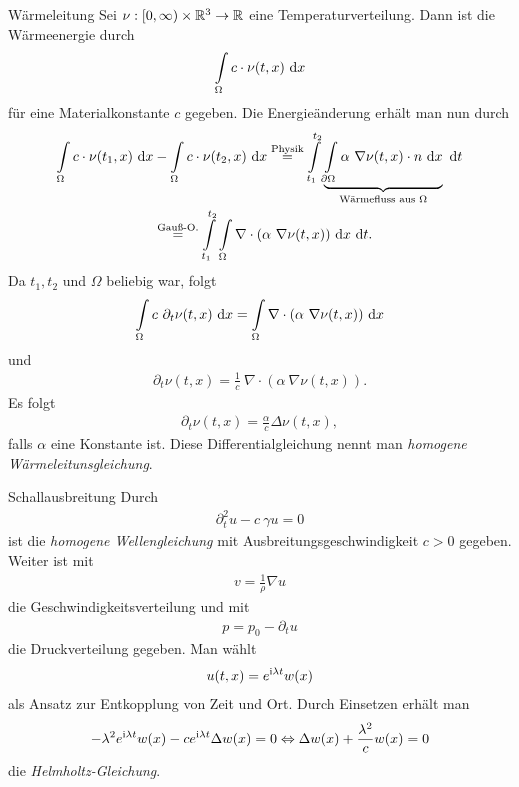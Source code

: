\begin{genericdf}{Wärmeleitung}
Sei $\nu:[0, \infty) \times \mathbb{R}^3 \to \mathbb{R}$ eine Temperaturverteilung.
Dann ist die Wärmeenergie durch
\begin{align*}
\int \limits_\Omega c \cdot \nu(t,x) \ \text{\rmfamily d} x
\end{align*}
für eine Materialkonstante $c$ gegeben.
Die Energieänderung erhält man nun durch
\begin{align*}
\int \limits_\Omega c \cdot \nu(t_1,x) \ \text{\rmfamily d} x
&-
\int \limits_\Omega c \cdot \nu(t_2,x) \ \text{\rmfamily d} x
\stackrel{\text{Physik}}{=}
\int \limits_{t_1}^{t_2} 
\underbrace{\int \limits _{\partial \Omega} 
\alpha \ \nabla \nu(t,x) \cdot n \ \text{\rmfamily d} x}_{\text{Wärmefluss aus $\Omega$}} \ \text{\rmfamily d} t\\
&\stackrel{\text{Gauß-O.}}{=}
\int \limits_{t_1}^{t_2}
\int \limits_\Omega 
\nabla \cdot ( \alpha \ \nabla \nu(t,x)) \ \text{\rmfamily d} x \ \text{\rmfamily d} t.
\end{align*}
Da $t_1,t_2 $ und $\Omega$ beliebig war, folgt
\begin{align*}
\int \limits_{\Omega}
c \ \partial_t \nu(t,x)  \ \text{\rmfamily d} x
= 
\int \limits_{\Omega}
\nabla \cdot ( \alpha \ \nabla \nu(t,x)) \ \text{\rmfamily d} x
\end{align*}
und
\begin{align*}
\partial_t \nu(t,x) = \frac{1}{c} \ \nabla \cdot ( \alpha \ \nabla \nu(t,x)).
\end{align*}
Es folgt
\begin{align*}
\partial_t \nu(t,x) = \frac{\alpha}{c} \Delta\nu(t,x),
\end{align*}
falls $\alpha$ eine Konstante ist.
Diese Differentialgleichung nennt man \textit{homogene Wärmeleitunsgleichung}.	
\end{genericdf}

\begin{genericdf}{Schallausbreitung}
Durch
\begin{align*}
\partial^2_t u- c \ \gamma u = 0
\end{align*}
ist die \textit{homogene Wellengleichung} mit Ausbreitungsgeschwindigkeit $c > 0$ gegeben.
Weiter ist mit
\begin{align*}
v = \frac{1}{\rho} \nabla u
\end{align*}
die Geschwindigkeitsverteilung und mit
\begin{align*}
p = p_0 - \partial_t u
\end{align*}
die Druckverteilung gegeben.
Man wählt 
\begin{align*}
u(t,x) = e^{\textrm{i}\lambda t} w(x)
\end{align*}
als Ansatz zur Entkopplung von Zeit und Ort.
Durch Einsetzen erhält man 
\begin{align*}
- \lambda^2 e^{\textrm{i}\lambda t} w(x) - 
c e^{\textrm{i}\lambda t} \Delta w(x) = 0
\Leftrightarrow
\Delta w(x)+ \frac{\lambda^2}{c} w(x) = 0
\end{align*}
die \textit{Helmholtz-Gleichung}.
\end{genericdf}

